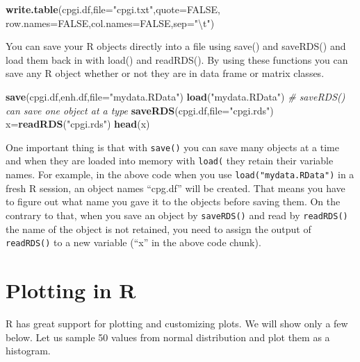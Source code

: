\documentclass[12pt,]{krantz}
\newenvironment{Shaded}{\begin{snugshade}}{\end{snugshade}}
\newcommand{\CharTok}[1]{\textcolor[rgb]{0.31,0.60,0.02}{#1}}
\newcommand{\CommentTok}[1]{\textcolor[rgb]{0.56,0.35,0.01}{\textit{#1}}}
\newcommand{\DataTypeTok}[1]{\textcolor[rgb]{0.13,0.29,0.53}{#1}}
\newcommand{\KeywordTok}[1]{\textcolor[rgb]{0.13,0.29,0.53}{\textbf{#1}}}
\newcommand{\NormalTok}[1]{#1}
\newcommand{\OtherTok}[1]{\textcolor[rgb]{0.56,0.35,0.01}{#1}}
\newcommand{\StringTok}[1]{\textcolor[rgb]{0.31,0.60,0.02}{#1}}
\theoremstyle{definition}
\theoremstyle{definition}
\theoremstyle{definition}
\theoremstyle{remark}
\begin{document}
\begin{Shaded}
\begin{Highlighting}[]
\KeywordTok{write.table}\NormalTok{(cpgi.df,}\DataTypeTok{file=}\StringTok{"cpgi.txt"}\NormalTok{,}\DataTypeTok{quote=}\OtherTok{FALSE}\NormalTok{,}
            \DataTypeTok{row.names=}\OtherTok{FALSE}\NormalTok{,}\DataTypeTok{col.names=}\OtherTok{FALSE}\NormalTok{,}\DataTypeTok{sep=}\StringTok{"}\CharTok{\textbackslash{}t}\StringTok{"}\NormalTok{)}
\end{Highlighting}
\end{Shaded}

You can save your R objects directly into a file using save() and
saveRDS() and load them back in with load() and readRDS(). By using
these functions you can save any R object whether or not they are in
data frame or matrix classes.

\begin{Shaded}
\begin{Highlighting}[]
\KeywordTok{save}\NormalTok{(cpgi.df,enh.df,}\DataTypeTok{file=}\StringTok{"mydata.RData"}\NormalTok{)}
\KeywordTok{load}\NormalTok{(}\StringTok{"mydata.RData"}\NormalTok{)}
\CommentTok{# saveRDS() can save one object at a type}
\KeywordTok{saveRDS}\NormalTok{(cpgi.df,}\DataTypeTok{file=}\StringTok{"cpgi.rds"}\NormalTok{)}
\NormalTok{x=}\KeywordTok{readRDS}\NormalTok{(}\StringTok{"cpgi.rds"}\NormalTok{)}
\KeywordTok{head}\NormalTok{(x)}
\end{Highlighting}
\end{Shaded}

One important thing is that with \texttt{save()} you can save many
objects at a time and when they are loaded into memory with
\texttt{load(} they retain their variable names. For example, in the
above code when you use \texttt{load("mydata.RData")} in a fresh R
session, an object names ``cpg.df'' will be created. That means you have
to figure out what name you gave it to the objects before saving them.
On the contrary to that, when you save an object by \texttt{saveRDS()}
and read by \texttt{readRDS()} the name of the object is not retained,
you need to assign the output of \texttt{readRDS()} to a new variable
(``x'' in the above code chunk).

\hypertarget{plotting-in-r}{%
\section{Plotting in R}\label{plotting-in-r}}

R has great support for plotting and customizing plots. We will show
only a few below. Let us sample 50 values from normal distribution and
plot them as a histogram.
\end{document}
